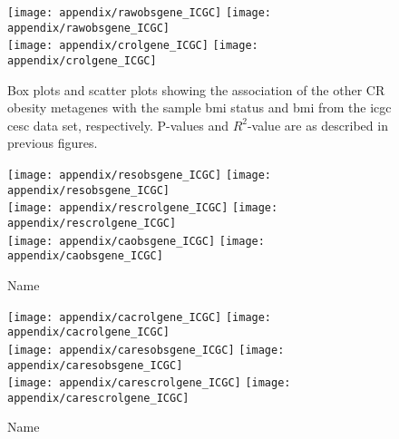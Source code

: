 \begin{appendices}
	\begin{figure}[!htpb]
		\centering
		\texttt{[image: appendix/rawobsgene\_ICGC]}
		\hfill
		\texttt{[image: appendix/rawobsgene\_ICGC]}\\
		\texttt{[image: appendix/crolgene\_ICGC]}
		\hfill
		\texttt{[image: appendix/crolgene\_ICGC]}\\
		\caption{Box plots and scatter plots showing the association of the other CR obesity metagenes with the sample \gls{bmi} status  and \gls{bmi} from the \gls{icgc} \gls{cesc} data set, respectively.
	P-values and $R^2$-value are as described in previous figures.}
		\label{fig:appendix/cr_ob_meta_box_scatter_cesc}
	\end{figure}

	\begin{figure}[htpb]
		\ContinuedFloat
		\captionsetup{list=off,format=cont}
		\centering
		\texttt{[image: appendix/resobsgene\_ICGC]}
		\hfill
		\texttt{[image: appendix/resobsgene\_ICGC]}\\
		\texttt{[image: appendix/rescrolgene\_ICGC]}
		\hfill
		\texttt{[image: appendix/rescrolgene\_ICGC]}\\
		\texttt{[image: appendix/caobsgene\_ICGC]}
		\hfill
		\texttt{[image: appendix/caobsgene\_ICGC]}\\
		\caption{Name}
	\end{figure}

	\begin{figure}[htpb]
		\ContinuedFloat
		\captionsetup{list=off,format=cont}
		\centering
		\texttt{[image: appendix/cacrolgene\_ICGC]}
		\hfill
		\texttt{[image: appendix/cacrolgene\_ICGC]}\\
		\texttt{[image: appendix/caresobsgene\_ICGC]}
		\hfill
		\texttt{[image: appendix/caresobsgene\_ICGC]}\\
		\texttt{[image: appendix/carescrolgene\_ICGC]}
		\hfill
		\texttt{[image: appendix/carescrolgene\_ICGC]}\\
		\caption{Name}
	\end{figure}

	\newpage


\end{appendices}
